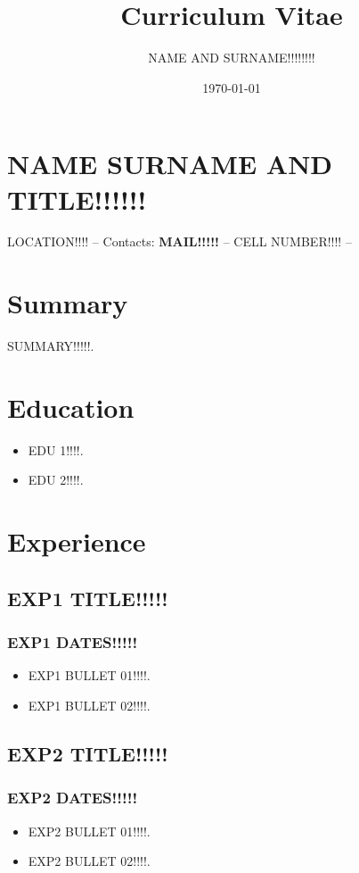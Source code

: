 \documentclass[a4paper, 9pt]{article}
\title{Curriculum Vitae}
\author{NAME AND SURNAME!!!!!!!!}
\date{\today}
\begin{document}
\section*{NAME SURNAME AND TITLE!!!!!!}

\small LOCATION!!!! -- Contacts: \textbf{MAIL!!!!!} -- CELL NUMBER!!!! -- 


\section*{Summary}
SUMMARY!!!!!.


\section*{Education}
\begin{itemize}[noitemsep]
	\item EDU 1!!!!.
    \item EDU 2!!!!.
\end{itemize}


\section*{Experience}

\subsection*{EXP1 TITLE!!!!!}
\subsubsection*{EXP1 DATES!!!!!}

\begin{itemize}[noitemsep]

    \item EXP1 BULLET 01!!!!.
    \item EXP1 BULLET 02!!!!.
\end{itemize}

\subsection*{EXP2 TITLE!!!!!}
\subsubsection*{EXP2 DATES!!!!!}
\begin{itemize}[noitemsep]
  \item EXP2 BULLET 01!!!!.
  \item EXP2 BULLET 02!!!!.
\end{itemize}
\end{document}
